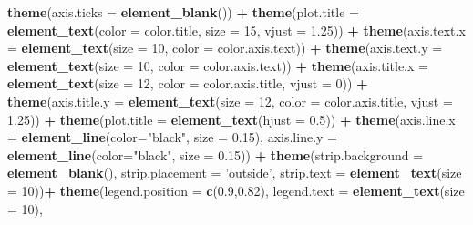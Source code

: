 \documentclass[]{article}
\newenvironment{Shaded}{\begin{snugshade}}{\end{snugshade}}
\newcommand{\KeywordTok}[1]{\textcolor[rgb]{0.13,0.29,0.53}{\textbf{#1}}}
\newcommand{\DataTypeTok}[1]{\textcolor[rgb]{0.13,0.29,0.53}{#1}}
\newcommand{\DecValTok}[1]{\textcolor[rgb]{0.00,0.00,0.81}{#1}}
\newcommand{\FloatTok}[1]{\textcolor[rgb]{0.00,0.00,0.81}{#1}}
\newcommand{\StringTok}[1]{\textcolor[rgb]{0.31,0.60,0.02}{#1}}
\newcommand{\OperatorTok}[1]{\textcolor[rgb]{0.81,0.36,0.00}{\textbf{#1}}}
\newcommand{\NormalTok}[1]{#1}
\begin{document}
\begin{Shaded}
\begin{Highlighting}[]
\StringTok{    }\KeywordTok{theme}\NormalTok{(}\DataTypeTok{axis.ticks =} \KeywordTok{element_blank}\NormalTok{()) }\OperatorTok{+}
\StringTok{    }\KeywordTok{theme}\NormalTok{(}\DataTypeTok{plot.title =} \KeywordTok{element_text}\NormalTok{(}\DataTypeTok{color =}\NormalTok{ color.title, }\DataTypeTok{size =} \DecValTok{15}\NormalTok{, }\DataTypeTok{vjust =} \FloatTok{1.25}\NormalTok{)) }\OperatorTok{+}
\StringTok{    }\KeywordTok{theme}\NormalTok{(}\DataTypeTok{axis.text.x =} \KeywordTok{element_text}\NormalTok{(}\DataTypeTok{size =} \DecValTok{10}\NormalTok{, }\DataTypeTok{color =}\NormalTok{ color.axis.text)) }\OperatorTok{+}\StringTok{ }
\StringTok{    }\KeywordTok{theme}\NormalTok{(}\DataTypeTok{axis.text.y =} \KeywordTok{element_text}\NormalTok{(}\DataTypeTok{size =} \DecValTok{10}\NormalTok{, }\DataTypeTok{color =}\NormalTok{ color.axis.text)) }\OperatorTok{+}\StringTok{ }
\StringTok{    }\KeywordTok{theme}\NormalTok{(}\DataTypeTok{axis.title.x =} \KeywordTok{element_text}\NormalTok{(}\DataTypeTok{size =} \DecValTok{12}\NormalTok{, }\DataTypeTok{color =}\NormalTok{ color.axis.title, }\DataTypeTok{vjust =} \DecValTok{0}\NormalTok{)) }\OperatorTok{+}
\StringTok{    }\KeywordTok{theme}\NormalTok{(}\DataTypeTok{axis.title.y =} \KeywordTok{element_text}\NormalTok{(}\DataTypeTok{size =} \DecValTok{12}\NormalTok{, }\DataTypeTok{color =}\NormalTok{ color.axis.title, }\DataTypeTok{vjust =} \FloatTok{1.25}\NormalTok{)) }\OperatorTok{+}
\StringTok{    }\KeywordTok{theme}\NormalTok{(}\DataTypeTok{plot.title =} \KeywordTok{element_text}\NormalTok{(}\DataTypeTok{hjust =} \FloatTok{0.5}\NormalTok{)) }\OperatorTok{+}
\StringTok{    }\KeywordTok{theme}\NormalTok{(}\DataTypeTok{axis.line.x =} \KeywordTok{element_line}\NormalTok{(}\DataTypeTok{color=}\StringTok{"black"}\NormalTok{, }\DataTypeTok{size =} \FloatTok{0.15}\NormalTok{),}
          \DataTypeTok{axis.line.y =} \KeywordTok{element_line}\NormalTok{(}\DataTypeTok{color=}\StringTok{"black"}\NormalTok{, }\DataTypeTok{size =} \FloatTok{0.15}\NormalTok{)) }\OperatorTok{+}
\StringTok{    }\KeywordTok{theme}\NormalTok{(}\DataTypeTok{strip.background =} \KeywordTok{element_blank}\NormalTok{(),}
          \DataTypeTok{strip.placement =} \StringTok{'outside'}\NormalTok{,}
          \DataTypeTok{strip.text =} \KeywordTok{element_text}\NormalTok{(}\DataTypeTok{size =} \DecValTok{10}\NormalTok{))}\OperatorTok{+}
\StringTok{    }\KeywordTok{theme}\NormalTok{(}\DataTypeTok{legend.position =} \KeywordTok{c}\NormalTok{(}\FloatTok{0.9}\NormalTok{,}\FloatTok{0.82}\NormalTok{),}
          \DataTypeTok{legend.text =} \KeywordTok{element_text}\NormalTok{(}\DataTypeTok{size =} \DecValTok{10}\NormalTok{),}

\end{Highlighting}
\end{Shaded}
\end{document}
